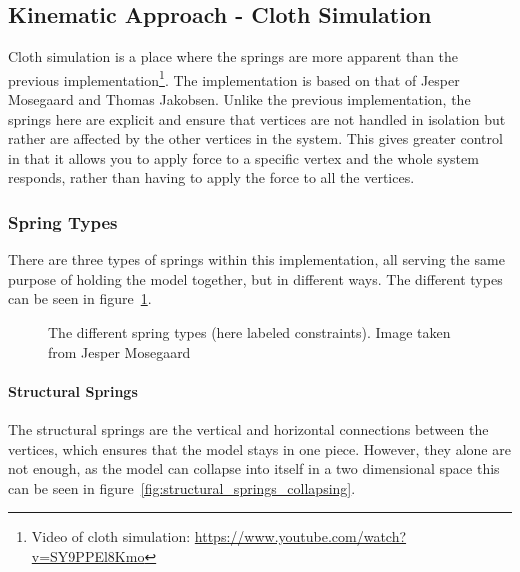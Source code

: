 \subsection{Kinematic Approach - Cloth Simulation}
Cloth simulation is a place where the springs are more apparent than the previous implementation\footnote{Video of cloth simulation: \url{https://www.youtube.com/watch?v=SY9PPEl8Kmo}}. 
The implementation is based on that of Jesper Mosegaard\cite{mosegaards_clothing_simulation} and Thomas Jakobsen\cite{jakobsen_advanced_character_physics}.
Unlike the previous implementation, the springs here are explicit and ensure that vertices are not handled in isolation but rather are affected by the other vertices in the system.
This gives greater control in that it allows you to apply force to a specific vertex and the whole system responds, rather than having to apply the force to all the vertices.

\subsubsection{Spring Types}
There are three types of springs within this implementation, all serving the same purpose of holding the model together,
but in different ways. The different types can be seen in figure~\ref{fig:spring_types}.
\begin{figure}
    \centering
    \caption{The different spring types (here labeled constraints). Image taken from Jesper Mosegaard\cite{mosegaards_clothing_simulation}}
    \label{fig:spring_types}
\end{figure}

\paragraph{Structural Springs}
The structural springs are the vertical and horizontal connections between the vertices, which ensures that the model stays in one piece.
However, they alone are not enough, as the model can collapse into itself in a two dimensional space\cite{jeff_lander_real_time_cloth} this can be seen in figure~\ref{fig:structural_springs_collapsing}.


